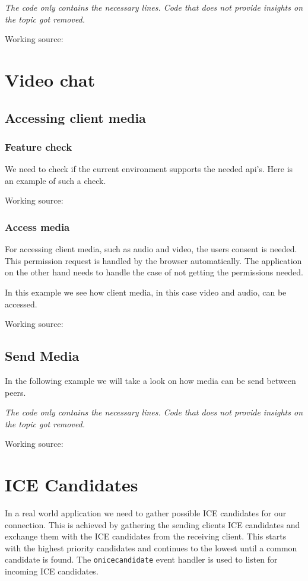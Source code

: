 \textit{The code only contains the necessary lines. Code that does not provide insights on the topic got removed.}

Working source:~\autocite{webrtc:senddata}

\section{Video chat}

\subsection{Accessing client media}

\subsubsection{Feature check}
We need to check if the current environment supports the needed \Gls{api}'s. Here is an example of such a check.

Working source:~\autocite{media:featurecheck}

\subsubsection{Access media}
For accessing client media, such as audio and video, the users consent is needed. This permission request is handled by the browser automatically. The application on the other hand needs to handle the case of not getting the permissions needed.

In this example we see how client media, in this case video and audio, can be accessed.

Working source:~\autocite{media:access}

\subsection{Send Media}
In the following example we will take a look on how media can be send between peers.

\textit{The code only contains the necessary lines. Code that does not provide insights on the topic got removed.}

Working source:~\autocite{webrtc:sendmedia}

\section{ICE Candidates}
In a real world application we need to gather possible ICE candidates for our connection. This is achieved by gathering the sending clients ICE candidates and exchange them with the ICE candidates from the receiving client. This starts with the highest priority candidates and continues to the lowest until a common candidate is found. The \lstinline[basicstyle=\ttfamily\color{black}]|onicecandidate| event handler is used to listen for incoming ICE candidates.